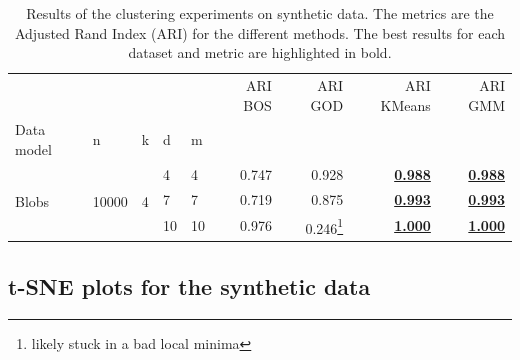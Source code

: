 \begin{table}[H]
    \begin{minipage}{\textwidth}
    \centering
    \begin{adjustbox}{width=.48\textwidth, center}
    \begin{tabular}{lllllrrrr}
     &  &  &  &  & ARI BOS & ARI GOD & ARI KMeans & ARI GMM \\
    Data model & n & k & d & m &  &  &  &  \\
    \cline{1-9}
        \multirow[t]{3}{*}{Blobs} & \multirow[t]{3}{*}{10000} & \multirow[t]{3}{*}{4} & 4 & 4 & 0.747 & 0.928 & \textbf{\underline{0.988}} & \textbf{\underline{0.988}} \\
    \cline{4-9}
        &  &  & 7 & 7 & 0.719 & 0.875 & \textbf{\underline{0.993}} & \textbf{\underline{0.993}} \\
    \cline{4-9}
        &  &  & 10 & 10 & 0.976 & 0.246\footnote{likely stuck in a bad local minima} & \textbf{\underline{1.000}} & \textbf{\underline{1.000}} \\
    \end{tabular}
    \end{adjustbox}
    \end{minipage}
    \caption{Results of the clustering experiments on synthetic data. The metrics are the Adjusted Rand Index (ARI) for the different methods. The best results for each dataset and metric are highlighted in bold.}
     \label{tab:results_synth_clustering}
\end{table}

\subsection*{t-SNE plots for the synthetic data}
\label{sec:appendix_tsne_synth}

